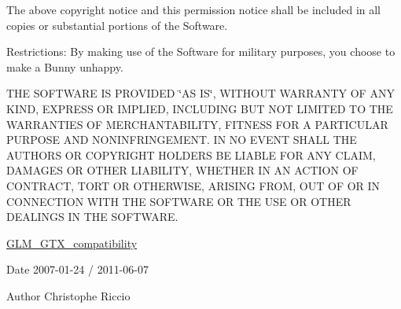 The above copyright notice and this permission notice shall be included in all copies or substantial portions of the Software.

Restrictions\-: By making use of the Software for military purposes, you choose to make a Bunny unhappy.

T\-H\-E S\-O\-F\-T\-W\-A\-R\-E I\-S P\-R\-O\-V\-I\-D\-E\-D \char`\"{}\-A\-S I\-S\char`\"{}, W\-I\-T\-H\-O\-U\-T W\-A\-R\-R\-A\-N\-T\-Y O\-F A\-N\-Y K\-I\-N\-D, E\-X\-P\-R\-E\-S\-S O\-R I\-M\-P\-L\-I\-E\-D, I\-N\-C\-L\-U\-D\-I\-N\-G B\-U\-T N\-O\-T L\-I\-M\-I\-T\-E\-D T\-O T\-H\-E W\-A\-R\-R\-A\-N\-T\-I\-E\-S O\-F M\-E\-R\-C\-H\-A\-N\-T\-A\-B\-I\-L\-I\-T\-Y, F\-I\-T\-N\-E\-S\-S F\-O\-R A P\-A\-R\-T\-I\-C\-U\-L\-A\-R P\-U\-R\-P\-O\-S\-E A\-N\-D N\-O\-N\-I\-N\-F\-R\-I\-N\-G\-E\-M\-E\-N\-T. I\-N N\-O E\-V\-E\-N\-T S\-H\-A\-L\-L T\-H\-E A\-U\-T\-H\-O\-R\-S O\-R C\-O\-P\-Y\-R\-I\-G\-H\-T H\-O\-L\-D\-E\-R\-S B\-E L\-I\-A\-B\-L\-E F\-O\-R A\-N\-Y C\-L\-A\-I\-M, D\-A\-M\-A\-G\-E\-S O\-R O\-T\-H\-E\-R L\-I\-A\-B\-I\-L\-I\-T\-Y, W\-H\-E\-T\-H\-E\-R I\-N A\-N A\-C\-T\-I\-O\-N O\-F C\-O\-N\-T\-R\-A\-C\-T, T\-O\-R\-T O\-R O\-T\-H\-E\-R\-W\-I\-S\-E, A\-R\-I\-S\-I\-N\-G F\-R\-O\-M, O\-U\-T O\-F O\-R I\-N C\-O\-N\-N\-E\-C\-T\-I\-O\-N W\-I\-T\-H T\-H\-E S\-O\-F\-T\-W\-A\-R\-E O\-R T\-H\-E U\-S\-E O\-R O\-T\-H\-E\-R D\-E\-A\-L\-I\-N\-G\-S I\-N T\-H\-E S\-O\-F\-T\-W\-A\-R\-E.

\hyperlink{group__gtx__compatibility}{G\-L\-M\-\_\-\-G\-T\-X\-\_\-compatibility}

\begin{DoxyDate}{Date}
2007-\/01-\/24 / 2011-\/06-\/07 
\end{DoxyDate}
\begin{DoxyAuthor}{Author}
Christophe Riccio 
\end{DoxyAuthor}
